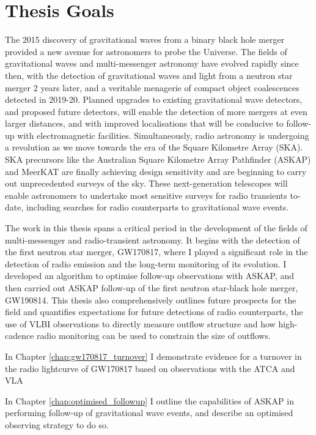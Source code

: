 \pagebreak
\section{Thesis Goals}
\label{sec:thesis_goals}
The 2015 discovery of gravitational waves from a binary black hole merger provided a new avenue for astronomers to probe the Universe. The fields of gravitational waves and multi-messenger astronomy have evolved rapidly since then, with the detection of gravitational waves and light from a neutron star merger 2 years later, and a veritable menagerie of compact object coalescences detected in 2019-20. Planned upgrades to existing gravitational wave detectors, and proposed future detectors, will enable the detection of more mergers at even larger distances, and with improved localisations that will be conducive to follow-up with electromagnetic facilities. Simultaneously, radio astronomy is undergoing a revolution as we move towards the era of the Square Kilometre Array (SKA). SKA precursors like the Australian Square Kilometre Array Pathfinder (ASKAP) and MeerKAT are finally achieving design sensitivity and are beginning to carry out unprecedented surveys of the sky. These next-generation telescopes will enable astronomers to undertake most sensitive surveys for radio transients to-date, including searches for radio counterparts to gravitational wave events.

The work in this thesis spans a critical period in the development of the fields of multi-messenger and radio-transient astronomy. It begins with the detection of the first neutron star merger, GW170817, where I played a significant role in the detection of radio emission and the long-term monitoring of its evolution. I developed an algorithm to optimise follow-up observations with ASKAP, and then carried out ASKAP follow-up of the first neutron star-black hole merger, GW190814. This thesis also comprehensively outlines future prospects for the field and quantifies expectations for future detections of radio counterparts, the use of VLBI observations to directly measure outflow structure and how high-cadence radio monitoring can be used to constrain the size of outflows.

In Chapter \ref{chap:gw170817_turnover} I demonstrate evidence for a turnover in the radio lightcurve of GW170817 based on observations with the ATCA and VLA

In Chapter \ref{chap:optimised_followup} I outline the capabilities of ASKAP in performing follow-up of gravitational wave events, and describe an optimised observing strategy to do so.

